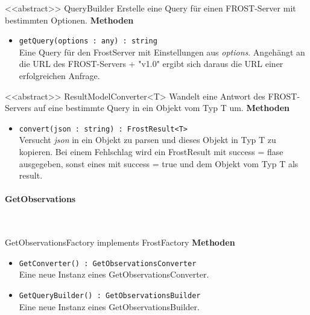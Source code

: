 \begin{Class}{<<abstract>> QueryBuilder}
    Erstelle eine Query für einen FROST-Server mit bestimmten Optionen.
    \textbf{Methoden}
    \begin{itemize}
        \item \texttt{getQuery(options : any) : string}
        \\ Eine Query für den FrostServer mit Einstellungen aus \emph{options}.
        Angehängt an die URL des FROST-Servers + "v1.0" ergibt sich daraus die URL einer erfolgreichen Anfrage.
    \end{itemize}
\end{Class}

\begin{Class}{<<abstract>> ResultModelConverter<T>}
    Wandelt eine Antwort des FROST-Servers auf eine bestimmte Query in ein Objekt vom Typ T um.
    \textbf{Methoden}
    \begin{itemize}
        \item \texttt{convert(json : string) : FrostResult<T>}
        \\ Versucht \emph{json} in ein Objekt zu parsen und dieses Objekt in Typ T zu kopieren.
        Bei einem Fehlschlag wird ein FrostResult mit success = flase ausgegeben, sonst eines mit success = true und dem Objekt vom Typ T als result.
    \end{itemize}
\end{Class}

\paragraph{GetObservations}\mbox{}\\
\begin{Class}{GetObservationsFactory implements FrostFactory}
    \textbf{Methoden}
    \begin{itemize}
        \item \texttt{GetConverter() : GetObservationsConverter}
        \\ Eine neue Instanz eines GetObservationsConverter.
        \item \texttt{GetQueryBuilder() : GetObservationsBuilder}
        \\ Eine neue Instanz eines GetObservationsBuilder.
    \end{itemize}
\end{Class}

